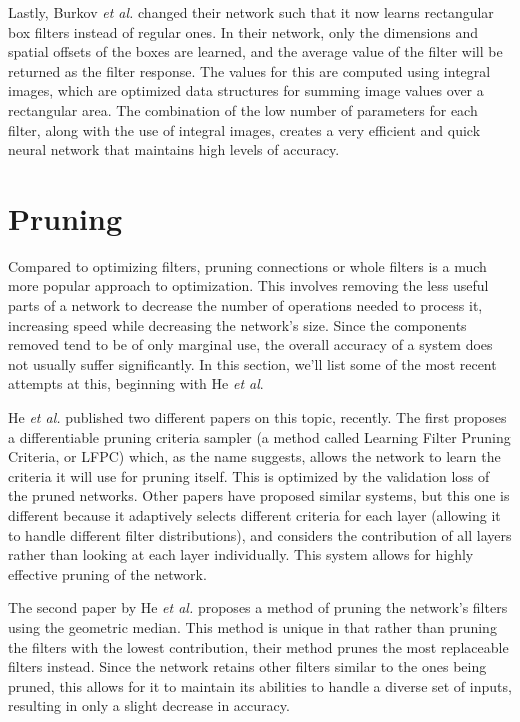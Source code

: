 \documentclass[11pt,a4paper,oldfontcommands]{memoir}
\begin{document}
Lastly, Burkov \textit{et al.} \cite{BoxConv} changed their network such that it now learns rectangular box filters instead of regular ones. In their network, only the dimensions and spatial offsets of the boxes are learned, and the average value of the filter will be returned as the filter response. The values for this are computed using integral images, which are optimized data structures for summing image values over a rectangular area. The combination of the low number of parameters for each filter, along with the use of integral images, creates a very efficient and quick neural network that maintains high levels of accuracy.

\section{Pruning}
Compared to optimizing filters, pruning connections or whole filters is a much more popular approach to optimization. This involves removing the less useful parts of a network to decrease the number of operations needed to process it, increasing speed while decreasing the network's size. Since the components removed tend to be of only marginal use, the overall accuracy of a system does not usually suffer significantly. In this section, we'll list some of the most recent attempts at this, beginning with He \textit{et al}.

He \textit{et al.} \cite{PruningC} published two different papers on this topic, recently. The first proposes a differentiable pruning criteria sampler (a method called Learning Filter Pruning Criteria, or LFPC) which, as the name suggests, allows the network to learn the criteria it will use for pruning itself. This is optimized by the validation loss of the pruned networks. Other papers have proposed similar systems, but this one is different because it adaptively selects different criteria for each layer (allowing it to handle different filter distributions), and considers the contribution of all layers rather than looking at each layer individually. This system allows for highly effective pruning of the network.

The second paper by He \textit{et al.} \cite{PruningG} proposes a method of pruning the network's filters using the geometric median. This method is unique in that rather than pruning the filters with the lowest contribution, their method prunes the most replaceable filters instead. Since the network retains other filters similar to the ones being pruned, this allows for it to maintain its abilities to handle a diverse set of inputs, resulting in only a slight decrease in accuracy.
\end{document}
